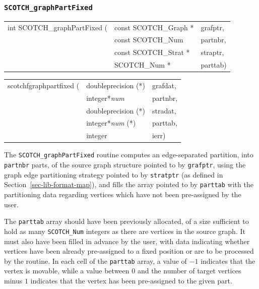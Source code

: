 \subsubsection{{\tt SCOTCH\_graphPartFixed}}
\label{sec-lib-func-graphpartfixed}

\begin{itemize}
\progsyn

{\tt\begin{tabular}{l@{}ll}
int SCOTCH\_graphPartFixed ( & const SCOTCH\_Graph * & grafptr, \\
                             & const SCOTCH\_Num     & partnbr, \\
                             & const SCOTCH\_Strat * & straptr, \\
                             & SCOTCH\_Num *         & parttab)
\end{tabular}}

{\tt\begin{tabular}{l@{}ll}
scotchfgraphpartfixed ( & doubleprecision (*)   & grafdat, \\
                        & integer*{\it num}     & partnbr, \\
                        & doubleprecision (*)   & stradat, \\
                        & integer*{\it num} (*) & parttab, \\
                        & integer               & ierr)
\end{tabular}}

\progdes

The {\tt SCOTCH\_graphPartFixed} routine computes an edge-separated
partition, into {\tt partnbr} parts, of the source graph structure
pointed to by {\tt grafptr}, using the graph edge partitioning
strategy pointed to by {\tt stratptr} (as defined in
Section~\ref{sec-lib-format-map}), and fills the array pointed to by
{\tt parttab} with the partitioning data regarding vertices which have
not been pre-assigned by the user.

The {\tt parttab} array should have been previously allocated, of a
size sufficient to hold as many {\tt SCOTCH\_\lbt Num} integers as
there are vertices in the source graph. It must also have been filled
in advance by the user, with data indicating whether vertices have
been already pre-assigned to a fixed position or are to be processed
by the routine. In each cell of the {\tt parttab} array, a value of
$-1$ indicates that the vertex is movable, while a value between $0$
and the number of target vertices minus $1$ indicates that the vertex
has been pre-assigned to the given part.


\end{itemize}
